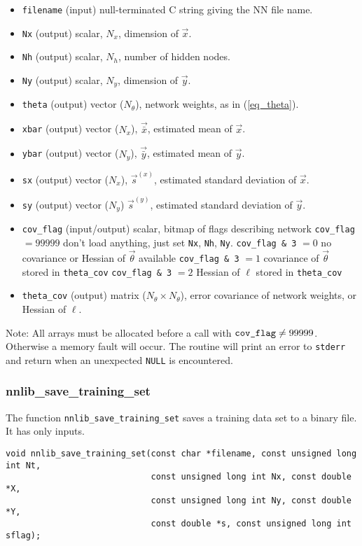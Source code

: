 \documentclass{article}    %
\begin{document}
\begin{itemize}
\item \verb|filename| (input) null-terminated C string giving the NN file name.
\item \verb|Nx| (output) scalar, $N_x$, dimension of $\vec{x}$.
\item \verb|Nh| (output) scalar, $N_h$, number of hidden nodes.
\item \verb|Ny| (output) scalar, $N_y$, dimension of $\vec{y}$.
\item \verb|theta| (output) vector ($N_{\theta}$), network weights, as in (\ref{eq_theta}).
\item \verb|xbar| (output) vector ($N_x$), $\vec{\bar{x}}$, estimated mean of $\vec{x}$.
\item \verb|ybar| (output) vector ($N_y$), $\vec{\bar{y}}$, estimated mean of $\vec{y}$.
\item \verb|sx| (output) vector ($N_x$), $\vec{s}^{(x)}$, estimated standard deviation of $\vec{x}$.
\item \verb|sy| (output) vector ($N_y$) $\vec{s}^{(y)}$, estimated standard deviation of $\vec{y}$.
\item \verb|cov_flag| (input/output) scalar, bitmap of flags describing network
  \subitem \verb|cov_flag| $=99999$ don't load anything, just set \verb|Nx|, \verb|Nh|, \verb|Ny|. 
  \subitem \verb|cov_flag & 3| $=0$ no covariance or Hessian of $\vec\theta$ available
  \subitem \verb|cov_flag & 3| $=1$ covariance of $\vec\theta$ stored in \verb|theta_cov|
  \subitem \verb|cov_flag & 3| $=2$ Hessian of $\ell$ stored in \verb|theta_cov|
\item \verb|theta_cov| (output) matrix ($N_{\theta} \times N_{\theta}$), error
  covariance of network weights, or Hessian of $\ell$. 
\end{itemize}
Note: All arrays must be allocated before a call with $\verb|cov_flag|
\ne 99999$. Otherwise a memory fault will occur. The routine will print an error to \verb|stderr|
and return when an unexpected \verb|NULL| is encountered.

\subsubsection{nnlib\_save\_training\_set}

The function \verb|nnlib_save_training_set| saves a training data set to a binary
file. It has only inputs.


\begin{verbatim}
void nnlib_save_training_set(const char *filename, const unsigned long int Nt, 
                             const unsigned long int Nx, const double *X, 
                             const unsigned long int Ny, const double *Y, 
                             const double *s, const unsigned long int sflag); 
\end{verbatim}
\end{document}
